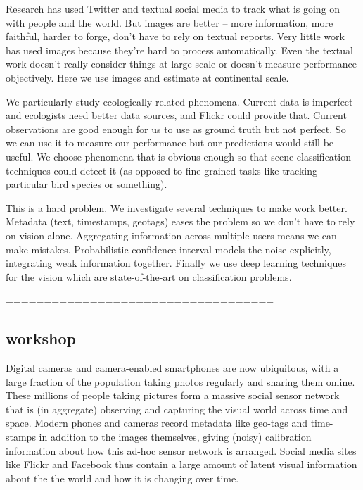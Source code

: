 Research has used Twitter and textual social media to track what is going on with people and the world. But images are better -- more information, more faithful, harder to forge, don't have to rely on textual reports. Very little work has used images because they're hard to process automatically. Even the textual work doesn't really consider things at large scale or doesn't measure performance objectively. Here we use images and estimate at continental scale.

We particularly study ecologically related phenomena. Current data is imperfect and ecologists need better data sources, and Flickr could provide that. Current observations are good enough for us to use as ground truth but not perfect. So we can use it to measure our performance but our predictions would still be useful. We choose phenomena that is obvious enough so that scene classification techniques could detect it (as opposed to fine-grained tasks like tracking particular bird species or something).

This is a hard problem. We investigate several techniques to make work better. Metadata (text, timestamps, geotags) eases the problem so we don't have to rely on vision alone. Aggregating information across multiple users means we can make mistakes. Probabilistic confidence interval models the noise explicitly, integrating weak information together. Finally we use deep learning techniques for the vision which are state-of-the-art on classification problems.

\hfill \break
\hfill \break
===================================
\hfill \break
\hfill \break
\subsection*{workshop}

Digital cameras and camera-enabled smartphones are now ubiquitous,
with a large fraction of the population taking photos regularly and
sharing them online. These millions of people taking pictures form a
massive social sensor network that is (in aggregate)
observing and capturing the visual world across time and space.
Modern phones and cameras record metadata like geo-tags and
time-stamps in addition to the images themselves, giving (noisy)
calibration information about how this ad-hoc sensor network is arranged.
%
Social media sites like Flickr and Facebook
thus contain a large amount of latent visual information about
the the world and how it is changing over time. 

